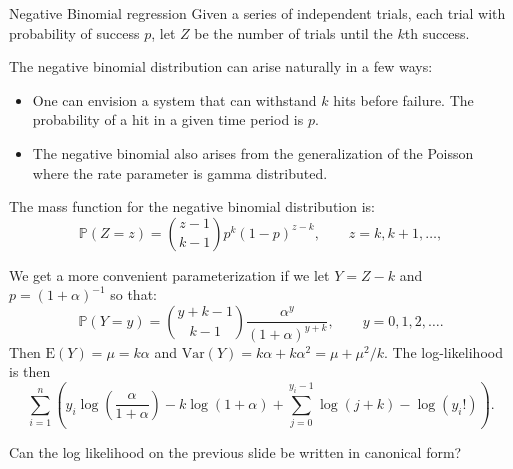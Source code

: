 \documentclass[
  ignorenonframetext,
]{beamer}
\providecommand{\tightlist}{%
  \setlength{\itemsep}{0pt}\setlength{\parskip}{0pt}}
\begin{document}
\begin{frame}{Negative Binomial regression}
\protect\hypertarget{negative-binomial-regression}{}
Given a series of independent trials, each trial with probability of
success \(p\), let \(Z\) be the number of trials until the \(k\)th
success.

\vspace{12pt}

The negative binomial distribution can arise naturally in a few ways:

\begin{itemize}
\tightlist
\item
  One can envision a system that can withstand \(k\) hits before
  failure. The probability of a hit in a given time period is \(p\).
\item
  The negative binomial also arises from the generalization of the
  Poisson where the rate parameter is gamma distributed.
\end{itemize}
\end{frame}

\begin{frame}{}
\protect\hypertarget{section-28}{}
The mass function for the negative binomial distribution is: \[
  \mathbb{P}(Z = z) = {z-1 \choose k-1}p^k(1-p)^{z-k}, \qquad z = k,k+1,\ldots,
\]

\vspace{12pt}

We get a more convenient parameterization if we let \(Y = Z - k\) and
\(p = (1 + \alpha)^{-1}\) so that: \[
  \mathbb{P}(Y=y) = {y+k-1 \choose k-1} \frac{\alpha^y}{(1+\alpha)^{y+k}}, \qquad y = 0,1,2,\ldots.
\] Then \(\mathrm{E}(Y) = \mu = k\alpha\) and
\(\mathrm{Var}(Y) = k\alpha + k\alpha^2 = \mu + \mu^2/k\). The
log-likelihood is then \[
  \sum_{i=1}^n\left(y_i\log\left(\frac{\alpha}{1 + \alpha}\right) - k\log(1 + \alpha) 
    + \sum_{j=0}^{y_i-1}\log(j+k) - \log(y_i!)\right).
\]
\end{frame}

\begin{frame}{}
\protect\hypertarget{section-29}{}
\begin{center}
Can the log likelihood on the previous slide be written in canonical form?
\end{center}
\end{frame}
\end{document}
